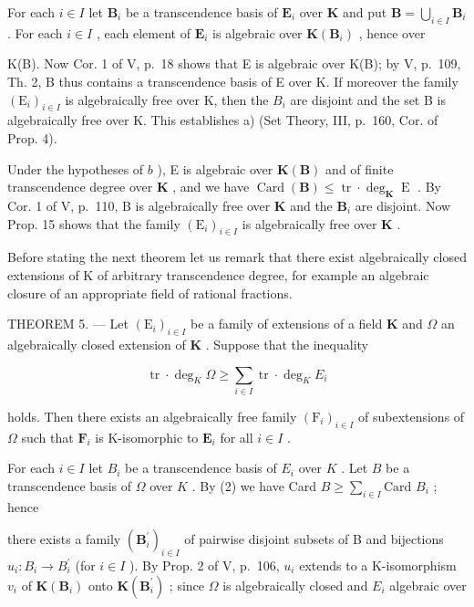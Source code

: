 For each \(i \in I\) let \(\mathbf{B}_i\) be a transcendence basis of \(\mathbf{E}_i\) over \(\mathbf{K}\) and put \(\mathbf{B} = \bigcup_{i \in I} \mathbf{B}_i\) . For each \(i \in I\) , each element of \(\mathbf{E}_i\) is algebraic over \(\mathbf{K}(\mathbf{B}_i)\) , hence over

K(B). Now Cor. 1 of V, p.~18 shows that E is algebraic over K(B); by V, p.~109, Th. 2, B thus contains a transcendence basis of E over K. If moreover the family \((\mathrm{E}_{i})_{i\in I}\) is algebraically free over K, then the \(B_{i}\) are disjoint and the set B is algebraically free over K. This establishes a) (Set Theory, III, p.~160, Cor. of Prop. 4).

Under the hypotheses of \(b\) ), E is algebraic over \(\mathbf{K}(\mathbf{B})\) and of finite transcendence degree over \(\mathbf{K}\) , and we have \(\operatorname{Card}(\mathbf{B}) \leqslant \operatorname{tr} \cdot \deg_{\mathbf{K}} \operatorname{E}\) . By Cor. 1 of V, p.~110, B is algebraically free over \(\mathbf{K}\) and the \(\mathbf{B}_i\) are disjoint. Now Prop. 15 shows that the family \((\mathrm{E}_i)_{i \in I}\) is algebraically free over \(\mathbf{K}\) .

Before stating the next theorem let us remark that there exist algebraically closed extensions of K of arbitrary transcendence degree, for example an algebraic closure of an appropriate field of rational fractions.

THEOREM 5. --- Let \((\mathrm{E}_i)_{i\in I}\) be a family of extensions of a field \(\mathbf{K}\) and \(\Omega\) an algebraically closed extension of \(\mathbf{K}\) . Suppose that the inequality

\[
\operatorname{tr} \cdot \deg_ {K} \Omega \geqslant \sum_ {i \in I} \operatorname{tr} \cdot \deg_ {K} E _ {i}\tag{2}
\]

holds. Then there exists an algebraically free family \((\mathrm{F}_i)_{i\in I}\) of subextensions of \(\Omega\) such that \(\mathbf{F}_i\) is K-isomorphic to \(\mathbf{E}_i\) for all \(i\in I\) .

For each \(i \in I\) let \(B_i\) be a transcendence basis of \(E_i\) over \(K\) . Let \(B\) be a transcendence basis of \(\Omega\) over \(K\) . By (2) we have Card \(B \geqslant \sum_{i \in I} \text{Card } B_i\) ; hence

there exists a family \((\mathbf{B}_{i}^{\prime})_{i\in I}\) of pairwise disjoint subsets of B and bijections \(u_{i}:B_{i}\to B_{i}^{\prime}\) (for \(i\in I\) ). By Prop. 2 of V, p.~106, \(u_{i}\) extends to a K-isomorphism \(v_{i}\) of \(\mathbf{K}(\mathbf{B}_{i})\) onto \(\mathbf{K}(\mathbf{B}_{i}^{\prime})\) ; since \(\Omega\) is algebraically closed and \(E_{i}\) algebraic over

